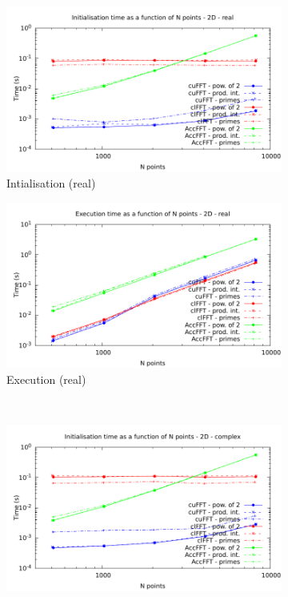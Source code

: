 \documentclass[12pt, a4paper]{article}
\begin{document}
\begin{figure}[H]
\captionsetup{width=0.8\linewidth}
\centering
\begin{subfigure}{.5\textwidth}
\centering
\includegraphics[width=.9\linewidth]{graphs/fft-2d-r-init.pdf}
\caption{Intialisation (real)}
\label{FFT2DRI}
\end{subfigure}%
\begin{subfigure}{.5\textwidth}
\centering
\includegraphics[width=.9\linewidth]{graphs/fft-2d-r-exec.pdf}
\caption{Execution (real)}
\label{FFT2DRE}
\end{subfigure}\\
\begin{subfigure}{.5\textwidth}
\centering
\includegraphics[width=.9\linewidth]{graphs/fft-2d-c-init.pdf}

\end{subfigure}
\end{figure}
\end{document}
